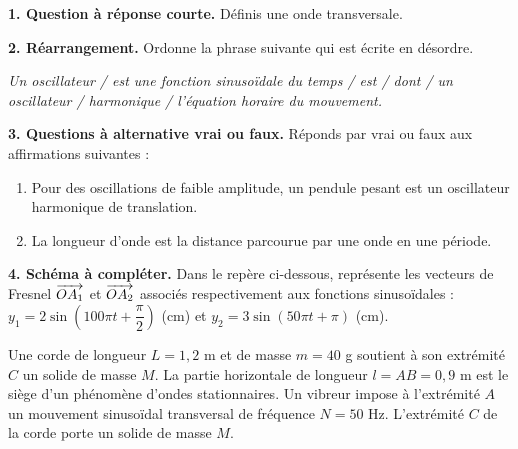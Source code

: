 \documentclass[11pt]{article}
\begin{document}


\noindent\textbf{1. Question à réponse courte.} Définis une onde transversale.

\medskip
\noindent\textbf{2. Réarrangement.} Ordonne la phrase suivante qui est écrite en désordre.

\textit{Un oscillateur / est une fonction sinusoïdale du temps / est / dont / un oscillateur / harmonique / l'équation horaire du mouvement.}

\medskip
\noindent\textbf{3. Questions à alternative vrai ou faux.} Réponds par vrai ou faux aux affirmations suivantes :
\begin{enumerate}[label=\alph*.]
  \item Pour des oscillations de faible amplitude, un pendule pesant est un oscillateur harmonique de translation.
  \item La longueur d'onde est la distance parcourue par une onde en une période.
\end{enumerate}

\medskip
\noindent\textbf{4. Schéma à compléter.} Dans le repère ci-dessous, représente les vecteurs de Fresnel $\overrightarrow{OA_1}$ et $\overrightarrow{OA_2}$ associés respectivement aux fonctions sinusoïdales : $y_1 = 2\sin\!\left(100\pi t + \dfrac{\pi}{2}\right)$ (cm) et $y_2 = 3\sin(50\pi t + \pi)$ (cm).

\begin{center}
\end{center}

Une corde de longueur $L = 1{,}2$ m et de masse $m = 40$ g soutient à son extrémité $C$ un solide de masse $M$. La partie horizontale de longueur $l = AB = 0{,}9$ m est le siège d'un phénomène d'ondes stationnaires. Un vibreur impose à l'extrémité $A$ un mouvement sinusoïdal transversal de fréquence $N = 50$ Hz. L'extrémité $C$ de la corde porte un solide de masse $M$.
\end{document}
